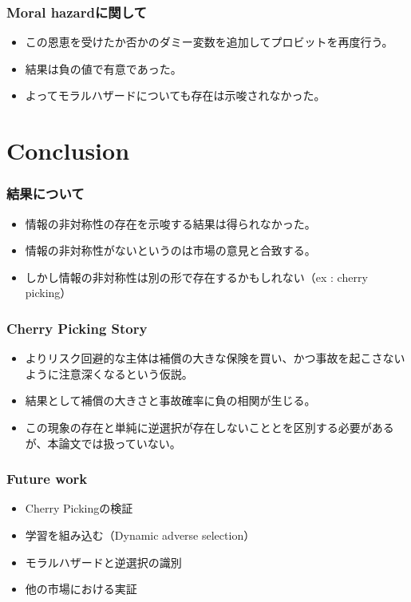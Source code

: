 \documentclass[dvipdfmx, 12pt]{beamer}
\begin{document}
\begin{frame}\frametitle{Moral hazardに関して}
	\begin{itemize}
	\item この恩恵を受けたか否かのダミー変数を追加してプロビットを再度行う。
	\item 結果は負の値で有意であった。
	\item よってモラルハザードについても存在は示唆されなかった。
	\end{itemize}
\end{frame}

\section{Conclusion}

\begin{frame}\frametitle{結果について}
	\begin{itemize}
	\item 情報の非対称性の存在を示唆する結果は得られなかった。
	\item 情報の非対称性がないというのは市場の意見と合致する。
	\item しかし情報の非対称性は別の形で存在するかもしれない（ex : cherry picking）
	\end{itemize}
\end{frame}

\begin{frame}\frametitle{Cherry Picking Story}
	\begin{itemize}
	\item よりリスク回避的な主体は補償の大きな保険を買い、かつ事故を起こさないように注意深くなるという仮説。
	\item 結果として補償の大きさと事故確率に負の相関が生じる。
	\item この現象の存在と単純に逆選択が存在しないこととを区別する必要があるが、本論文では扱っていない。
	\end{itemize}
\end{frame}

\begin{frame}\frametitle{Future work}
	\begin{itemize}
	\item Cherry Pickingの検証
	\item 学習を組み込む（Dynamic adverse selection）
	\item モラルハザードと逆選択の識別
	\item 他の市場における実証
	\end{itemize}
\end{frame}
\end{document}
